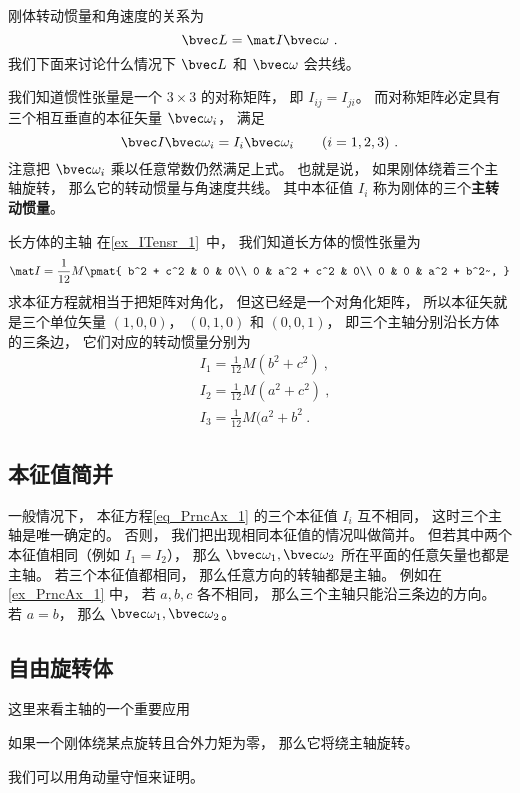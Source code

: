 
\begin{issues}
\issueDraft
\end{issues}


刚体转动惯量和角速度的关系为
\begin{equation}
\bvec L = \mat I \bvec \omega~.
\end{equation}
我们下面来讨论什么情况下 $\bvec L$ 和 $\bvec \omega$ 会共线。

我们知道惯性张量是一个 $3\times 3$ 的对称矩阵， 即 $I_{ij} = I_{ji}$。 而对称矩阵必定具有三个相互垂直的本征矢量 $\bvec \omega_i$， 满足
\begin{equation}\label{eq_PrncAx_1}
\bvec I \bvec \omega_i = I_i \bvec \omega_i \qquad (i = 1,2,3)~.
\end{equation}
注意把 $\bvec \omega_i$ 乘以任意常数仍然满足上式。 也就是说， 如果刚体绕着三个主轴旋转， 那么它的转动惯量与角速度共线。 其中本征值 $I_i$ 称为刚体的三个\textbf{主转动惯量}。

\begin{example}{长方体的主轴}\label{ex_PrncAx_1}
在\autoref{ex_ITensr_1}~中， 我们知道长方体的惯性张量为
\begin{equation}
\mat I = \frac{1}{12} M
\pmat{
   b^2 + c^2 & 0 & 0\\
   0 & a^2 + c^2 & 0\\
   0 & 0 & a^2 + b^2~,
}
\end{equation}
求本征方程就相当于把矩阵对角化， 但这已经是一个对角化矩阵， 所以本征矢就是三个单位矢量 $(1,0,0)$， $(0,1,0)$ 和 $(0,0,1)$， 即三个主轴分别沿长方体的三条边， 它们对应的转动惯量分别为
\begin{equation}
\begin{aligned}
&I_1 = \frac{1}{12}M(b^2+c^2)~,\\
&I_2 = \frac{1}{12}M(a^2+c^2)~,\\
&I_3 = \frac{1}{12}M(a^2+b^2~.
\end{aligned}
\end{equation}
\end{example}

\subsection{本征值简并}
一般情况下， 本征方程\autoref{eq_PrncAx_1} 的三个本征值 $I_i$ 互不相同， 这时三个主轴是唯一确定的。 否则， 我们把出现相同本征值的情况叫做简并。 但若其中两个本征值相同（例如 $I_1 = I_2$）， 那么 $\bvec \omega_1, \bvec \omega_2$ 所在平面的任意矢量也都是主轴。 若三个本征值都相同， 那么任意方向的转轴都是主轴。 例如在\autoref{ex_PrncAx_1} 中， 若 $a,b,c$ 各不相同， 那么三个主轴只能沿三条边的方向。 若 $a = b$， 那么 $\bvec \omega_1, \bvec \omega_2$。

\subsection{自由旋转体}
这里来看主轴的一个重要应用
\begin{theorem}{}
如果一个刚体绕某点旋转且合外力矩为零， 那么它将绕主轴旋转。
\end{theorem}
我们可以用角动量守恒来证明。

